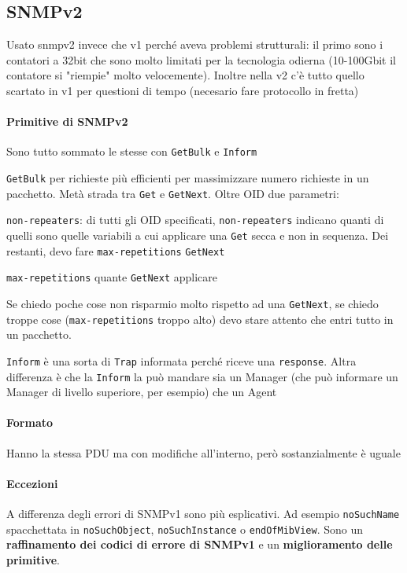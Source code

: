 \documentclass[10pt]{book}
\begin{document}
\subsection{SNMPv2}
Usato snmpv2 invece che v1 perché aveva problemi strutturali: il primo sono i contatori a 32bit che sono molto limitati per la tecnologia odierna (10-100Gbit il contatore si "riempie" molto velocemente). Inoltre nella v2 c'è tutto quello scartato in v1 per questioni di tempo (necesario fare protocollo in fretta)
\paragraph{Primitive di SNMPv2} Sono tutto sommato le stesse con \texttt{GetBulk} e \texttt{Inform}
\begin{list}{}{}
	\item \texttt{GetBulk} per richieste più efficienti per massimizzare numero richieste in un pacchetto. Metà strada tra \texttt{Get} e \texttt{GetNext}. Oltre OID due parametri:
	\begin{list}{}{}
		\item \texttt{non-repeaters}: di tutti gli OID specificati, \texttt{non-repeaters} indicano quanti di quelli sono quelle variabili a cui applicare una \texttt{Get} secca e non in sequenza. Dei restanti, devo fare \texttt{max-repetitions} \texttt{GetNext}
		\item \texttt{max-repetitions} quante \texttt{GetNext} applicare
	\end{list}
	Se chiedo poche cose non risparmio molto rispetto ad una \texttt{GetNext}, se chiedo troppe cose (\texttt{max-repetitions} troppo alto) devo stare attento che entri tutto in un pacchetto.
	\item \texttt{Inform} è una sorta di \texttt{Trap} informata perché riceve una \texttt{response}. Altra differenza è che la \texttt{Inform} la può mandare sia un Manager (che può informare un Manager di livello superiore, per esempio) che un Agent
\end{list}
\paragraph{Formato} Hanno la stessa PDU ma con modifiche all'interno, però sostanzialmente è uguale
\paragraph{Eccezioni} A differenza degli errori di SNMPv1 sono più esplicativi. Ad esempio \texttt{noSuchName} spacchettata in \texttt{noSuchObject}, \texttt{noSuchInstance} o \texttt{endOfMibView}. Sono un \textbf{raffinamento dei codici di errore di SNMPv1} e un \textbf{miglioramento delle primitive}.
\end{document}
